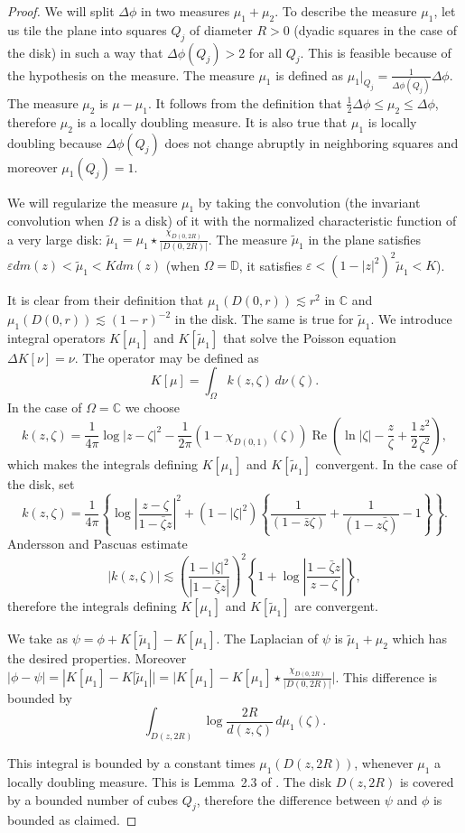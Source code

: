 \documentclass[12pt,twoside,final,psamsfonts]{amsart}
\theoremstyle{plain}
\theoremstyle{remark}
\theoremstyle{definition}
\newcommand{\C}{{\mathbb C}}
\newcommand{\D}{{\mathbb D}}
\renewcommand{\Re}{\operatorname{Re}}
\begin{document}
\begin{proof}
We will split $\Delta \phi$ in two measures $\mu_1+\mu_2$.   To
describe the measure $\mu_1$,  let us tile the plane into squares
$Q_j$ of diameter $R>0$ (dyadic squares in the case of the disk) in such a way
that $\Delta\phi(Q_j)>2$ for all  $Q_j$. This is feasible because of the
hypothesis on the measure. The measure  $\mu_1$ is defined as
$\mu_1|_{Q_j}=\frac 1{\Delta\phi(Q_j)}\Delta\phi$.  The measure $\mu_2$ is
$\mu-\mu_1$. 
It follows from the definition that  $\frac 12 \Delta\phi \le \mu_2\le
\Delta\phi$, therefore $\mu_2$ is a locally
doubling  measure. It is also true that $\mu_1$ is locally doubling
 because $\Delta\phi(Q_j)$ does not change abruptly in neighboring
squares
 and moreover $\mu_1(Q_j)=1$.  

We will regularize the measure $\mu_1$ by taking the convolution  (the
invariant convolution when $\Omega$ is a disk) of it  with the normalized
characteristic
function of a very large disk: $\widetilde \mu_1= \mu_1 \star
\frac{\chi_{D(0,2R)}}{|D(0,2R)|}$. The measure  $\widetilde\mu_1$ in the plane 
satisfies
$\varepsilon dm(z) <\widetilde \mu_1<K dm(z)$ (when $\Omega=\D$, it satisfies
$\varepsilon<(1-|z|^2)^2\widetilde\mu_1< K$). 

It is clear from their definition that $\mu_1(D(0,r))\lesssim r^2$ in $\C$ and
$\mu_1(D(0,r))\lesssim (1-r)^{-2}$ in the disk. The same is true for 
$\widetilde \mu_1$. We introduce integral operators $K[\mu_1]$ and
$K[\widetilde\mu_1]$ that solve the Poisson equation $\Delta K[\nu]=\nu$. The
operator may be defined as
\[
K[\mu]=\int_{\Omega}k(z,\zeta)\, d\nu(\zeta).
\]
In the case of $\Omega=\C$ we choose
\[
k(z,\zeta)=\frac 1{4\pi}\log|z-\zeta|^2-\frac1{2\pi}(1-\chi_{D(0,1)}(\zeta))\Re \left(\ln
|\zeta|-\frac z\zeta + \frac 12 \frac{z^2}{\zeta^2}\right),
\]
which makes the integrals defining $K[\mu_1]$ and $K[\widetilde \mu_1]$ 
convergent. In the case of the disk, set
\[
k(z,\zeta)=\frac 1{4\pi}\left\{\log\left|\frac{z-\zeta}{1-\bar\zeta z}\right|^2
+ {(1-|\zeta|^2)}\left\{\frac 1{(1-\bar z\zeta)}+
\frac 1{(1-z\bar\zeta)}-1\right\}\right\}.
\]
Andersson \cite{Andersson85} and Pascuas \cite{Pascuas88} estimate
\[
|k(z,\zeta)|\lesssim \left(\frac{1-|\zeta|^2}{|1-\bar\zeta z|}\right)^{2}
\left\{1+\log\left|\frac{1-\bar\zeta z}{z-\zeta}\right|\right\},
\]
therefore the integrals defining  $K[\mu_1]$ and $K[\widetilde\mu_1]$
are convergent.
 
We take as $\psi=\phi +K[\widetilde\mu_1]- K[\mu_1]$.
The Laplacian of $\psi$ is $\widetilde\mu_1+\mu_2$ which has the desired 
properties. Moreover $|\phi-\psi|=|K[\mu_1]-K[\widetilde\mu_1||=|K[\mu_1]-
K[\mu_1]\star \frac{\chi_{D(0,2R)}}{|D(0,2R)|}|$. This difference is bounded
by 
\[
\int_{D(z,2R)}\log \frac{2R}{d(z,\zeta)}\, d\mu_1(\zeta).
\]

This integral is bounded by a constant times $\mu_1(D(z,2R))$, whenever $\mu_1$ 
a locally
doubling measure. This is Lemma~2.3 of \cite{Christ91}. 
The disk $D(z,2R)$ is covered by a 
bounded number of cubes $Q_j$, therefore the difference between 
$\psi$ and $\phi$
is bounded as claimed.
\end{proof}
\end{document}
